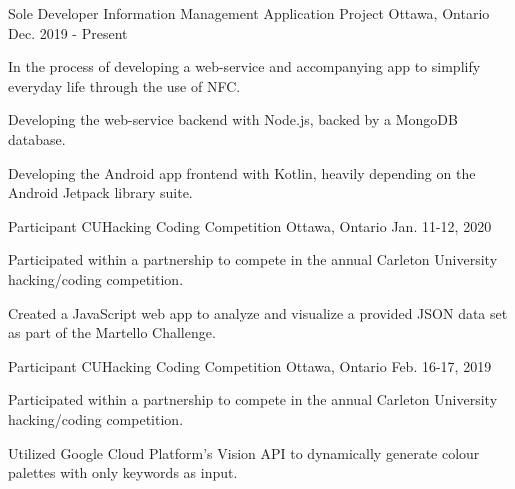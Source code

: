

\begin{cventries}

  \cventry
    {Sole Developer} %
    {Information Management Application Project} %
    {Ottawa, Ontario} %
    {Dec. 2019 - Present} %
    {
      \begin{cvitems} %
      \item {In the process of developing a web-service and accompanying app to simplify everyday life through the use of NFC.}
      \item {Developing the web-service backend with Node.js, backed by a MongoDB database.}
      \item {Developing the Android app frontend with Kotlin, heavily depending on the Android Jetpack library suite.}
      \end{cvitems}
    }

  \cventry
    {Participant} %
    {CUHacking Coding Competition} %
    {Ottawa, Ontario} %
    {Jan. 11-12, 2020} %
    {
      \begin{cvitems} %
      \item {Participated within a partnership to compete in the annual Carleton University hacking/coding competition.}
      \item {Created a JavaScript web app to analyze and visualize a provided JSON data set as part of the Martello Challenge.}
      \end{cvitems}
    }

  \cventry
    {Participant} %
    {CUHacking Coding Competition} %
    {Ottawa, Ontario} %
    {Feb. 16-17, 2019} %
    {
      \begin{cvitems} %
      \item {Participated within a partnership to compete in the annual Carleton University hacking/coding competition.}
      \item {Utilized Google Cloud Platform's Vision API to dynamically generate colour palettes with only keywords as input.}
      \end{cvitems}
    }


\end{cventries}
